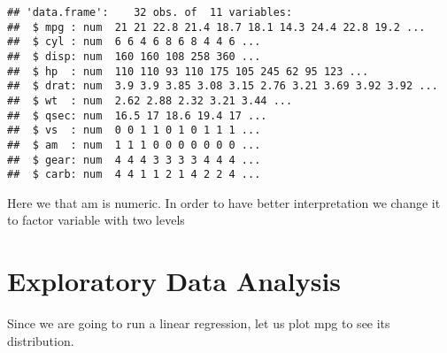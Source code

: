 \documentclass[]{article}
\newenvironment{Shaded}{\begin{snugshade}}{\end{snugshade}}
\newcommand{\KeywordTok}[1]{\textcolor[rgb]{0.13,0.29,0.53}{\textbf{#1}}}
\newcommand{\StringTok}[1]{\textcolor[rgb]{0.31,0.60,0.02}{#1}}
\newcommand{\OperatorTok}[1]{\textcolor[rgb]{0.81,0.36,0.00}{\textbf{#1}}}
\newcommand{\NormalTok}[1]{#1}
\begin{document}
\begin{verbatim}
## 'data.frame':    32 obs. of  11 variables:
##  $ mpg : num  21 21 22.8 21.4 18.7 18.1 14.3 24.4 22.8 19.2 ...
##  $ cyl : num  6 6 4 6 8 6 8 4 4 6 ...
##  $ disp: num  160 160 108 258 360 ...
##  $ hp  : num  110 110 93 110 175 105 245 62 95 123 ...
##  $ drat: num  3.9 3.9 3.85 3.08 3.15 2.76 3.21 3.69 3.92 3.92 ...
##  $ wt  : num  2.62 2.88 2.32 3.21 3.44 ...
##  $ qsec: num  16.5 17 18.6 19.4 17 ...
##  $ vs  : num  0 0 1 1 0 1 0 1 1 1 ...
##  $ am  : num  1 1 1 0 0 0 0 0 0 0 ...
##  $ gear: num  4 4 4 3 3 3 3 4 4 4 ...
##  $ carb: num  4 4 1 1 2 1 4 2 2 4 ...
\end{verbatim}

Here we that am is numeric. In order to have better interpretation we
change it to factor variable with two levels

\begin{Shaded}
\end{Shaded}

\section{Exploratory Data Analysis}\label{exploratory-data-analysis}

Since we are going to run a linear regression, let us plot mpg to see
its distribution.
\end{document}
